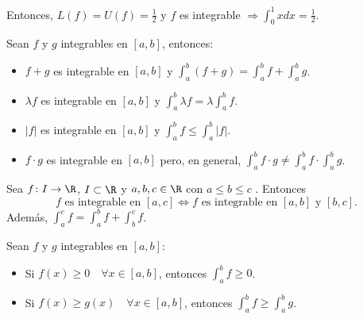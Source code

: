 \begin{example}
	Entonces, \(L(f) = U(f) = \frac{1}{2}\) y \(f \) es integrable \(\Rightarrow \int^{1}_{0} x dx = \frac{1}{2} \).

	\begin{figure}[H]
		\centering
	\end{figure}
\end{example}

\begin{proposition}
	Sean \(f \) y \(g \) integrables en \([a,b ]\), entonces:
	\begin{itemize}
		\item \(f + g \) es integrable en \([a,b ]\) y \(\int^{b}_a (f + g) = \int^{b}_a f + \int^{b}_a g \).
		\item \(\lambda f \) es integrable en \([a,b ]\) y \(\int^{b}_a \lambda f = \lambda \int^{b}_a f\).
		\item \(\left\vert f  \right\vert \) es integrable en \([a,b ]\) y \(\int^{b}_a f \leq \int^{b}_a \left\vert f  \right\vert . \)
		\item \(f \cdot g \) es integrable en \([a,b ]\) pero, en general, \(\int^{b}_a f \cdot g \neq \int^{b}_a f \cdot \int^{b}_a g\).
	\end{itemize}
\end{proposition}
\begin{proposition}
	Sea \(f\colon I \to \R\), \(I \subset \R\) y \(a,b,c \in \R\) con \(a \leq  b \leq  c\) . Entonces
	\[
		f \text{ es integrable en } [a,c] \iff f \text{ es integrable en } [a,b] \text{ y } [b,c].
	\]
	Además, \(\int^{c}_a f = \int^{b}_{a} f + \int^{c}_b f\).
\end{proposition}
\begin{proposition}
	Sean \(f \) y \(g \) integrables en \([a,b ]\):
	\begin{itemize}
		\item Si \(f(x) \geq 0 \quad  \forall x \in [a,b]\), entonces \(\int^{b}_a f \geq 0\).
		\item Si \(f(x) \geq g(x) \quad \forall x \in [a,b]\), entonces \(\int^{b}_a f \geq \int^{b}_a g\).
	\end{itemize}
\end{proposition}

